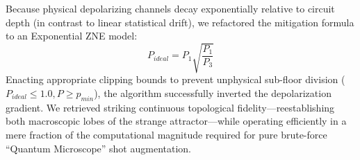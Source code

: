 \documentclass[11pt,a4paper]{article}
\begin{document}
Because physical depolarizing channels decay exponentially relative to circuit depth (in contrast to linear statistical drift), we refactored the mitigation formula to an Exponential ZNE model: 
$$ P_{ideal} = P_1 \sqrt{\frac{P_1}{P_3}} $$
Enacting appropriate clipping bounds to prevent unphysical sub-floor division ($P_{ideal} \leq 1.0, P \geq p_{min}$), the algorithm successfully inverted the depolarization gradient. We retrieved striking continuous topological fidelity—reestablishing both macroscopic lobes of the strange attractor—while operating efficiently in a mere fraction of the computational magnitude required for pure brute-force ``Quantum Microscope'' shot augmentation.
\end{document}
